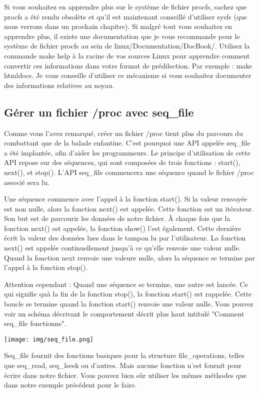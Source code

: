 \documentclass[11pt]{article}
\begin{document}
Si vous souhaitez en apprendre plus sur le système de fichier procfs, sachez que procfs a été rendu obsolète et qu'il est maintenant conseillé d'utiliser sysfs (que nous verrons dans un prochain chapitre). Si malgré tout vous souhaitez en apprendre plus, il existe une documentation que je vous recommande pour le système de fichier procfs au sein de linux/Documentation/DocBook/. Utilisez la commande make help à la racine de vos sources Linux pour apprendre comment convertir ces informations dans votre format de prédilection. Par exemple : make htmldocs. Je vous conseille d'utiliser ce mécanisme si vous souhaitez documenter des informations relatives au noyau.

\subsection*{Gérer un fichier /proc avec seq\_file}
\label{sec-7-3}

Comme vous l'avez remarqué, créer un fichier /proc tient plus du parcours du combattant que de la balade enfantine. C'est pourquoi une API appelée seq\_file a été implantée, afin d'aider les programmeurs. Le principe d'utilisation de cette API repose sur des séquences, qui sont composées de trois fonctions : start(), next(), et stop(). L'API seq\_file commencera une séquence quand le fichier /proc associé sera lu.

Une séquence commence avec l'appel à la fonction start(). Si la valeur renvoyée est non nulle, alors la fonction next() est appelée. Cette fonction est un itérateur. Son but est de parcourir les données de notre fichier. À chaque fois que la fonction next() est appelée, la fonction show() l'est également. Cette dernière écrit la valeur des données lues dans le tampon lu par l'utilisateur. La fonction next() est appelée continuellement jusqu'à ce qu'elle renvoie une valeur nulle. Quand la fonction next renvoie une valeure nulle, alors la séquence se termine par l'appel à la fonction stop().

Attention cependant : Quand une séquence se termine, une autre est lancée. Ce qui signifie quà la fin de la fonction stop(), la fonction start() est rappelée. Cette boucle se termine quand la fonction start() renvoie une valeur nulle. Vous pouvez voir un schéma décrivant le comportement décrit plus haut intitulé "Comment seq\_file fonctionne".

\texttt{[image: img/seq\_file.png]}

Seq\_file fournit des fonctions basiques pour la structure file\_operations, telles que seq\_read, seq\_lseek ou d'autres. Mais aucune fonction n'est fournit pour écrire dans notre fichier. Vous pouvez bien sûr utiliser les mêmes méthodes que dans notre exemple précédent pour le faire.
\end{document}
